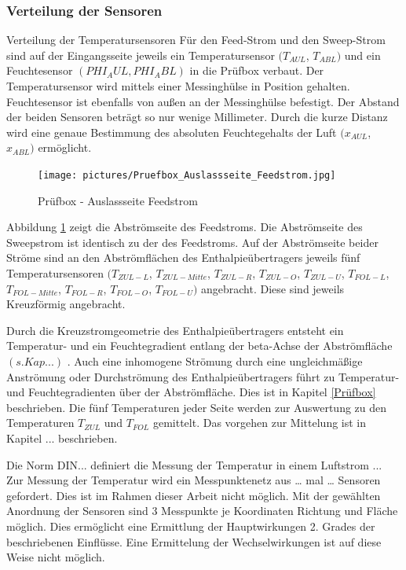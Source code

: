 \subsubsection{Verteilung der Sensoren}
\label{Verteilung der Sensoren}

Verteilung der Temperatursensoren
Für den Feed-Strom und den Sweep-Strom sind auf der Eingangsseite jeweils ein Temperatursensor $(T_{AUL}$, $T_{ABL})$ und ein Feuchtesensor $(PHI_AUL, PHI_ABL)$ in die Prüfbox verbaut. Der Temperatursensor wird mittels einer Messinghülse in Position gehalten. Feuchtesensor ist ebenfalls von außen an der Messinghülse befestigt. Der Abstand der beiden Sensoren beträgt so nur wenige Millimeter. Durch die kurze Distanz wird eine genaue Bestimmung des absoluten Feuchtegehalts der Luft $(x_{AUL}$, $x_{ABL})$ ermöglicht. 


\begin{figure} [h]
	\centering
	\texttt{[image: pictures/Pruefbox\_Auslassseite\_Feedstrom.jpg]}
	\caption{Prüfbox - Auslassseite Feedstrom}
	\label{fig:Prüfbox - Auslassseite Feedstrom}
\end{figure}

Abbildung \ref{fig:Prüfbox - Auslassseite Feedstrom} zeigt die Abströmseite des Feedstroms. Die Abströmseite des Sweepstrom ist identisch zu der des Feedstroms. Auf der Abströmseite beider Ströme sind an den Abströmflächen des Enthalpieübertragers jeweils fünf Temperatursensoren $(T_{ZUL-L}$, $T_{ZUL-Mitte}$, $T_{ZUL-R}$, $T_{ZUL-O}$, $T_{ZUL-U}$, $T_{FOL-L}$, $T_{FOL-Mitte}$, $T_{FOL-R}$, $T_{FOL-O}$, $T_{FOL-U})$ angebracht. Diese sind jeweils Kreuzförmig angebracht.

Durch die Kreuzstromgeometrie des Enthalpieübertragers entsteht ein Temperatur- und ein Feuchtegradient entlang der beta-Achse der Abströmfläche $(s.Kap...)$ . Auch eine inhomogene Strömung durch eine ungleichmäßige Anströmung oder Durchströmung des Enthalpieübertragers führt zu Temperatur- und Feuchtegradienten über der Abströmfläche. Dies ist in Kapitel \ref{Prüfbox} beschrieben. Die fünf Temperaturen jeder Seite werden zur Auswertung zu den Temperaturen $T_{ZUL}$ und $T_{FOL}$ gemittelt. Das vorgehen zur Mittelung ist in Kapitel ... beschrieben. 

Die Norm DIN... definiert die Messung der Temperatur in einem Luftstrom ...  Zur Messung der Temperatur wird ein Messpunktenetz aus … mal … Sensoren gefordert. Dies ist im Rahmen dieser Arbeit nicht möglich. Mit der gewählten Anordnung der Sensoren sind 3 Messpunkte je Koordinaten Richtung und Fläche möglich. Dies ermöglicht eine Ermittlung der Hauptwirkungen 2. Grades der beschriebenen Einflüsse. Eine Ermittelung der Wechselwirkungen ist auf diese Weise nicht möglich. 

